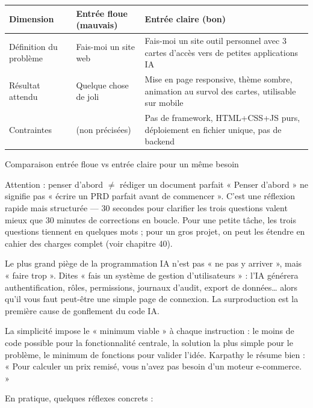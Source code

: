 \begin{center}
\begin{tabularx}{\linewidth}{|X|X|X|}
\hline
\textbf{Dimension} & \textbf{Entrée floue (mauvais)} & \textbf{Entrée claire (bon)} \tabularnewline
\hline
Définition du problème & Fais-moi un site web & Fais-moi un site outil personnel avec 3 cartes d'accès vers de petites applications IA \tabularnewline
Résultat attendu & Quelque chose de joli & Mise en page responsive, thème sombre, animation au survol des cartes, utilisable sur mobile \tabularnewline
Contraintes & (non précisées) & Pas de framework, HTML+CSS+JS purs, déploiement en fichier unique, pas de backend \tabularnewline
\hline
\end{tabularx}
\end{center}

\begin{center}\small\color{gray}Comparaison entrée floue vs entrée claire pour un même besoin\end{center}

\begin{tcbwarn}{Attention : penser d'abord $\neq$ rédiger un document parfait}
« Penser d'abord » ne signifie pas « écrire un PRD parfait avant de commencer ». C'est une réflexion rapide mais structurée — 30 secondes pour clarifier les trois questions valent mieux que 30 minutes de corrections en boucle. Pour une petite tâche, les trois questions tiennent en quelques mots ; pour un gros projet, on peut les étendre en cahier des charges complet (voir chapitre 40).

\end{tcbwarn}


Le plus grand piège de la programmation IA n'est pas « ne pas y arriver », mais « faire trop ». Dites « fais un système de gestion d'utilisateurs » : l'IA générera authentification, rôles, permissions, journaux d'audit, export de données… alors qu'il vous faut peut-être une simple page de connexion. La surproduction est la première cause de gonflement du code IA.

La simplicité impose le « minimum viable » à chaque instruction : le moins de code possible pour la fonctionnalité centrale, la solution la plus simple pour le problème, le minimum de fonctions pour valider l'idée. Karpathy le résume bien : « Pour calculer un prix remisé, vous n'avez pas besoin d'un moteur e-commerce. »

En pratique, quelques réflexes concrets :

